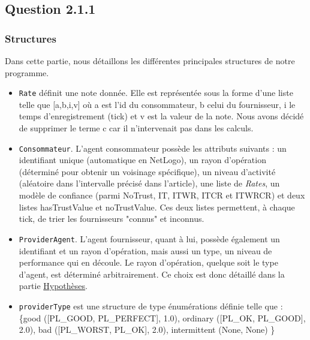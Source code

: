 \subsection{Question 2.1.1}

\subsubsection{Structures}
Dans cette partie, nous détaillons les différentes principales structures de notre programme.
\label{sec:structures} 
\begin{itemize}
    \item \texttt{Rate} définit une note donnée. Elle est représentée sous la forme d'une liste telle que [a,b,i,v] où a est l'id du consommateur, b celui du fournisseur, i le temps d'enregistrement (tick) et v est la valeur de la note. Nous avons décidé de supprimer le terme c car il n'intervenait pas dans les calculs.
    \item \texttt{Consommateur}. L'agent consommateur possède les attributs suivants : un identifiant unique (automatique en NetLogo), un rayon d'opération (déterminé pour obtenir un voisinage spécifique), un niveau d'activité (aléatoire dans l'intervalle précisé dans l'article), une liste de \textit{Rates}, un modèle de confiance (parmi NoTrust, IT, ITWR, ITCR et ITWRCR) et deux listes hasTrustValue et noTrustValue. Ces deux listes permettent, à chaque tick, de trier les fournisseurs "connus" et inconnus. 

    \item \texttt{ProviderAgent}. L'agent fournisseur, quant à lui, possède également un identifiant et un rayon d'opération, mais aussi un type, un niveau de performance qui en découle. Le rayon d'opération, quelque soit le type d'agent, est déterminé arbitrairement. Ce choix est donc détaillé dans la partie \hyperref[sec:hypotheses]{Hypothèses}.
    
    \item \texttt{providerType} est une structure de type énumérations définie telle que : \newline
	\{\newline \quad good ([PL\_GOOD, PL\_PERFECT], 1.0), \newline \quad ordinary ([PL\_OK, PL\_GOOD], 2.0), \newline \quad bad ([PL\_WORST, PL\_OK], 2.0), \newline \quad intermittent (None, None) \newline	\}


\end{itemize}

